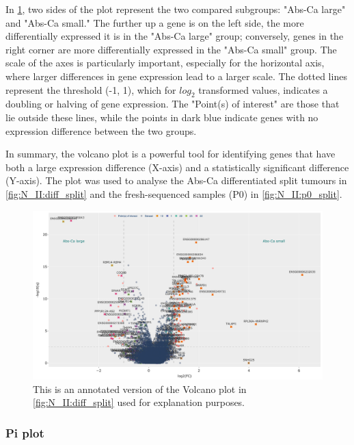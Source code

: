 In \cref{fig:lit:dea_eg}, two sides of the plot represent the two compared subgroups: "Abs-Ca large" and "Abs-Ca small." The further up a gene is on the left side, the more differentially expressed it is in the "Abs-Ca large" group; conversely, genes in the right corner are more differentially expressed in the "Abs-Ca small" group. The scale of the axes is particularly important, especially for the horizontal axis, where larger differences in gene expression lead to a larger scale. The dotted lines represent the threshold (-1, 1), which for $log_{2}$ transformed values, indicates a doubling or halving of gene expression. The "Point(s) of interest" are those that lie outside these lines, while the points in dark blue indicate genes with no expression difference between the two groups.

In summary, the volcano plot is a powerful tool for identifying genes that have both a large expression difference (X-axis) and a statistically significant difference (Y-axis). The plot was used to analyse the Abs-Ca differentiated split tumours in \cref{fig:N_II:diff_split} and the fresh-sequenced samples (P0) in \cref{fig:N_II:p0_split}.

\begin{figure}[H] 
    \centering
    \includegraphics[width=1.0\textwidth,height=1.0\textheight,keepaspectratio]{Sections/Network_II/resources/non_tum/diff_split_dea.png}
    \caption{This is an annotated version of the Volcano plot in \cref{fig:N_II:diff_split} used for explanation purposes.}
    \label{fig:lit:dea_eg}
\end{figure}



\subsubsection{Pi plot} \label{s:lit:pi}

